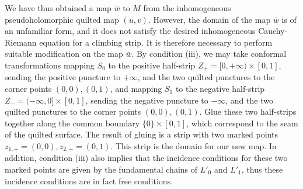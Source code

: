 \documentclass{amsart}
\numberwithin{equation}{section}
\numberwithin{figure}{section}
\begin{document}
	We have thus obtained a map $\bar{w}$ to $M$ from the inhomogeneous pseudoholomorphic quilted map $(u, v)$. However, the domain of the map $\bar{w}$ is of an unfamiliar form, and it does not satisfy the desired inhomogeneous Cauchy-Riemann equation for a climbing strip. It is therefore necessary to perform suitable modification on the map $\bar{w}$. By condition (iii), we may take conformal transformations mapping $S_{0}$ to the positive half-strip $Z_{+} = [0, +\infty) \times [0, 1]$, sending the positive puncture to $+\infty$, and the two quilted punctures to the corner points $(0, 0), (0, 1)$, and mapping $S_{1}$ to the negative half-strip $Z_{-} = (-\infty, 0] \times [0, 1]$, sending the negative puncture to $-\infty$, and the two quilted punctures to the corner points $(0, 0), (0, 1)$. Glue these two half-strips together along the common boundary $\{0\} \times [0, 1]$, which correspond to the seam of the quilted surface. The result of gluing is a strip with two marked points $z_{1, +} = (0, 0), z_{2, +} = (0, 1)$. This strip is the domain for our new map. In addition, condition (iii) also implies that the incidence conditions for these two marked points are given by the fundamental chains of $L'_{0}$ and $L'_{1}$, thus these incidence conditions are in fact free conditions. \par
\end{document}
